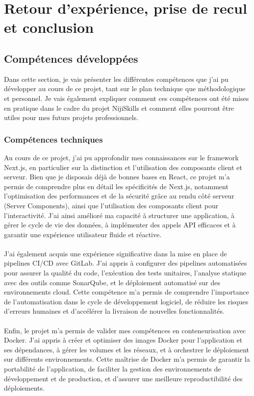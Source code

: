 \documentclass[12pt]{article}
\begin{document}
\newpage
\section{Retour d’expérience, prise de recul et conclusion}
\subsection{Compétences développées}
Dans cette section, je vais présenter les différentes compétences que j'ai pu développer au cours de ce projet, tant sur le plan technique que méthodologique et personnel. Je vais également expliquer comment ces compétences ont été mises en pratique dans le cadre du projet NijiSkills et comment elles pourront être utiles pour mes futurs projets professionnels.
\subsubsection{Compétences techniques}
Au cours de ce projet, j’ai pu approfondir mes connaissances sur le framework Next.js, en particulier sur la distinction et l’utilisation des composants client et serveur. Bien que je disposais déjà de bonnes bases en React, ce projet m’a permis de comprendre plus en détail les spécificités de Next.js, notamment l’optimisation des performances et de la sécurité grâce au rendu côté serveur (Server Components), ainsi que l’utilisation des composants client pour l’interactivité. J’ai ainsi amélioré ma capacité à structurer une application, à gérer le cycle de vie des données, à implémenter des appels API efficaces et à garantir une expérience utilisateur fluide et réactive.
\\\\
J’ai également acquis une expérience significative dans la mise en place de pipelines CI/CD avec GitLab. J’ai appris à configurer des pipelines automatisées pour assurer la qualité du code, l’exécution des tests unitaires, l’analyse statique avec des outils comme SonarQube, et le déploiement automatisé sur des environnements cloud. Cette compétence m’a permis de comprendre l’importance de l’automatisation dans le cycle de développement logiciel, de réduire les risques d’erreurs humaines et d’accélérer la livraison de nouvelles fonctionnalités.
\\\\
Enfin, le projet m’a permis de valider mes compétences en conteneurisation avec Docker. J’ai appris à créer et optimiser des images Docker pour l’application et ses dépendances, à gérer les volumes et les réseaux, et à orchestrer le déploiement sur différents environnements. Cette maîtrise de Docker m’a permis de garantir la portabilité de l’application, de faciliter la gestion des environnements de développement et de production, et d’assurer une meilleure reproductibilité des déploiements.
\end{document}

